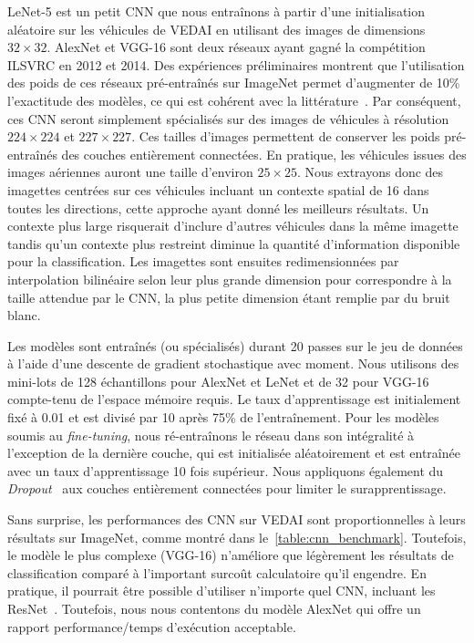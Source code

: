  LeNet-5 est un petit \gls{CNN} que nous entraînons à partir d'une initialisation aléatoire sur les véhicules de \gls{VEDAI} en utilisant des images de dimensions $32\times32$. AlexNet et VGG-16 sont deux réseaux ayant gagné la compétition \gls{ILSVRC} en 2012 et 2014. Des expériences préliminaires montrent que l'utilisation des poids de ces réseaux pré-entraînés sur ImageNet permet d'augmenter de 10\% l'exactitude des modèles, ce qui est cohérent avec la littérature~\cite{nogueira_towards_2016,penatti_deep_2015}. Par conséquent, ces \gls{CNN} seront simplement spécialisés sur des images de véhicules à résolution $224 \times 224$ et $227 \times 227$.
 Ces tailles d'images permettent de conserver les poids pré-entraînés des couches entièrement connectées. En pratique, les véhicules issues des images aériennes auront une taille d'environ $25\times 25$. Nous extrayons donc des imagettes centrées sur ces véhicules incluant un contexte spatial de \SI{16}{\px} dans toutes les directions, cette approche ayant donné les meilleurs résultats. Un contexte plus large risquerait d'inclure d'autres véhicules dans la même imagette tandis qu'un contexte plus restreint diminue la quantité d'information disponible pour la classification. Les imagettes sont ensuites redimensionnées par interpolation bilinéaire selon leur plus grande dimension pour correspondre à la taille attendue par le \gls{CNN}, la plus petite dimension étant remplie par du bruit blanc.

Les modèles sont entraînés (ou spécialisés) durant 20 passes sur le jeu de données à l'aide d'une descente de gradient stochastique avec moment. Nous utilisons des mini-lots de 128 échantillons pour AlexNet et LeNet et de 32 pour VGG-16 compte-tenu de l'espace mémoire requis. Le taux d'apprentissage est initialement fixé à 0.01 et est divisé par 10 après 75\% de l'entraînement. Pour les modèles soumis au \emph{fine-tuning}, nous ré-entraînons le réseau dans son intégralité à l'exception de la dernière couche, qui est initialisée aléatoirement et est entraînée avec un taux d'apprentissage 10 fois supérieur. Nous appliquons également du \emph{Dropout}~\cite{srivastava_dropout_2014} aux couches entièrement connectées pour limiter le surapprentissage.

Sans surprise, les performances des \gls{CNN} sur \gls{VEDAI} sont proportionnelles à leurs résultats sur ImageNet, comme montré dans le~\cref{table:cnn_benchmark}. Toutefois, le modèle le plus complexe (VGG-16) n'améliore que légèrement les résultats de classification comparé à l'important surcoût calculatoire qu'il engendre. En pratique, il pourrait être possible d'utiliser n'importe quel \gls{CNN}, incluant les ResNet~\cite{he_deep_2016}. Toutefois, nous nous contentons du modèle AlexNet qui offre un rapport performance/temps d'exécution acceptable.

